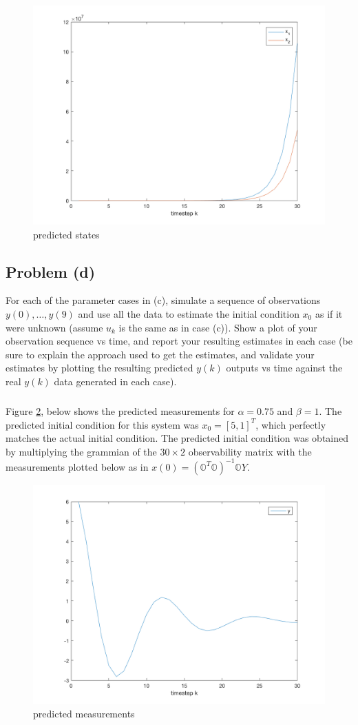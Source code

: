 \documentclass[11pt]{article}
\begin{document}
\begin{figure}[h!]
	\centering
	\includegraphics[width=0.6\linewidth]{2c_plot3.png}
	\caption{predicted states}
	\label{fig:2c_plot3}
\end{figure}

\subsection*{Problem (d)}
For each of the parameter cases in (c), simulate a sequence of observations $y(0),\dots,y(9)$ and use all the data to estimate the initial condition $x_0$ as if it were unknown (assume $u_k$ is the same as in case (c)). Show a plot of your observation sequence vs time, and report your resulting estimates in each case (be sure to explain the approach used to get the estimates, and validate your estimates by plotting the resulting predicted $y(k)$ outputs vs time against the real $y(k)$ data generated in each case).

\subparagraph*{}

Figure \ref{fig:2d_plot1}, below shows the predicted measurements for $\alpha=0.75$ and $\beta=1$. The predicted initial condition for this system was $x_0=[5,1]^T$, which perfectly matches the actual initial condition. The predicted initial condition was obtained by multiplying the grammian of the $30\times2$ observability matrix with the measurements plotted below as in $x(0)=(\mathbb{O}^T\mathbb{O})^{-1}\mathbb{O}Y$. 

\begin{figure}[h!]
	\centering
	\includegraphics[width=0.6\linewidth]{2d_plot1.png}
	\caption{predicted measurements}
	\label{fig:2d_plot1}
\end{figure}
\end{document}
